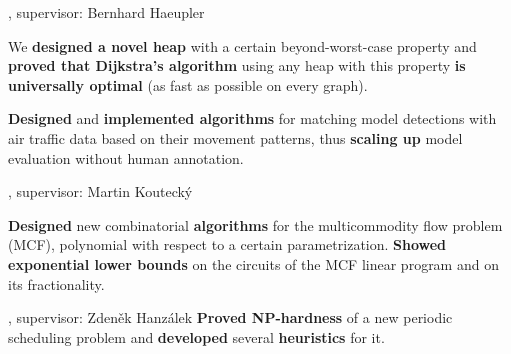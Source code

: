 , supervisor: Bernhard Haeupler

\: We {\bf designed a novel heap} with a certain beyond-worst-case property and {\bf proved that Dijkstra's algorithm} using any heap with this property {\bf is universally optimal} (as fast as possible on every graph).
\endlist


%
\: {\bf Designed} and {\bf implemented algorithms} for matching model detections with air traffic data based on their movement patterns, thus {\bf scaling up} model evaluation without human annotation.
%
\endlist

, supervisor: Martin Koutecký

%
\: {\bf Designed} new combinatorial {\bf algorithms} for the multicommodity flow problem (MCF), polynomial with respect to a certain parametrization.
\: {\bf Showed exponential lower bounds} on the circuits of the MCF linear program and on its fractionality.
\endlist

, supervisor: Zdeněk Hanzálek
%
%
\: {\bf Proved NP-hardness} of a new periodic scheduling problem and {\bf
developed} several {\bf heuristics} for it.

\endlist


